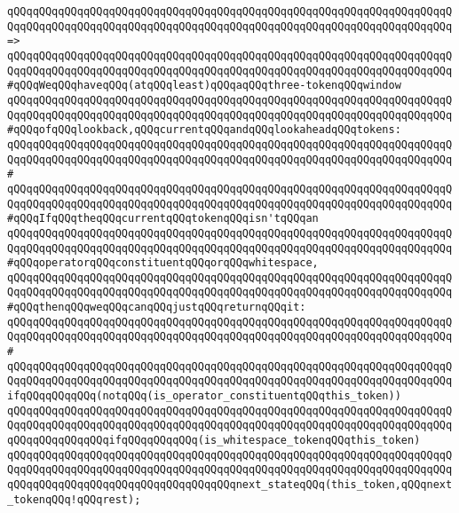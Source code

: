 \verb|qQQqqQQqqQQqqQQqqQQqqQQqqQQqqQQqqQQqqQQqqQQqqQQqqQQqqQQqqQQqqQQqqQQqqQQqqQQqqQQqqQQqqQQqqQQqqQQqqQQqqQQqqQQqqQQqqQQqqQQqqQQqqQQqqQQqqQQqqQQq=>|\newline
\verb|qQQqqQQqqQQqqQQqqQQqqQQqqQQqqQQqqQQqqQQqqQQqqQQqqQQqqQQqqQQqqQQqqQQqqQQqqQQqqQQqqQQqqQQqqQQqqQQqqQQqqQQqqQQqqQQqqQQqqQQqqQQqqQQqqQQqqQQqqQQq#qQQqWeqQQqhaveqQQq(atqQQqleast)qQQqaqQQqthree-tokenqQQqwindow|\newline
\verb|qQQqqQQqqQQqqQQqqQQqqQQqqQQqqQQqqQQqqQQqqQQqqQQqqQQqqQQqqQQqqQQqqQQqqQQqqQQqqQQqqQQqqQQqqQQqqQQqqQQqqQQqqQQqqQQqqQQqqQQqqQQqqQQqqQQqqQQqqQQq#qQQqofqQQqlookback,qQQqcurrentqQQqandqQQqlookaheadqQQqtokens:|\newline
\verb|qQQqqQQqqQQqqQQqqQQqqQQqqQQqqQQqqQQqqQQqqQQqqQQqqQQqqQQqqQQqqQQqqQQqqQQqqQQqqQQqqQQqqQQqqQQqqQQqqQQqqQQqqQQqqQQqqQQqqQQqqQQqqQQqqQQqqQQqqQQq#|\newline
\verb|qQQqqQQqqQQqqQQqqQQqqQQqqQQqqQQqqQQqqQQqqQQqqQQqqQQqqQQqqQQqqQQqqQQqqQQqqQQqqQQqqQQqqQQqqQQqqQQqqQQqqQQqqQQqqQQqqQQqqQQqqQQqqQQqqQQqqQQqqQQq#qQQqIfqQQqtheqQQqcurrentqQQqtokenqQQqisn'tqQQqan|\newline
\verb|qQQqqQQqqQQqqQQqqQQqqQQqqQQqqQQqqQQqqQQqqQQqqQQqqQQqqQQqqQQqqQQqqQQqqQQqqQQqqQQqqQQqqQQqqQQqqQQqqQQqqQQqqQQqqQQqqQQqqQQqqQQqqQQqqQQqqQQqqQQq#qQQqoperatorqQQqconstituentqQQqorqQQqwhitespace,|\newline
\verb|qQQqqQQqqQQqqQQqqQQqqQQqqQQqqQQqqQQqqQQqqQQqqQQqqQQqqQQqqQQqqQQqqQQqqQQqqQQqqQQqqQQqqQQqqQQqqQQqqQQqqQQqqQQqqQQqqQQqqQQqqQQqqQQqqQQqqQQqqQQq#qQQqthenqQQqweqQQqcanqQQqjustqQQqreturnqQQqit:|\newline
\verb|qQQqqQQqqQQqqQQqqQQqqQQqqQQqqQQqqQQqqQQqqQQqqQQqqQQqqQQqqQQqqQQqqQQqqQQqqQQqqQQqqQQqqQQqqQQqqQQqqQQqqQQqqQQqqQQqqQQqqQQqqQQqqQQqqQQqqQQqqQQq#|\newline
\verb|qQQqqQQqqQQqqQQqqQQqqQQqqQQqqQQqqQQqqQQqqQQqqQQqqQQqqQQqqQQqqQQqqQQqqQQqqQQqqQQqqQQqqQQqqQQqqQQqqQQqqQQqqQQqqQQqqQQqqQQqqQQqqQQqqQQqqQQqqQQqifqQQqqQQqqQQq(notqQQq(is_operator_constituentqQQqthis_token))|\newline
\newline
\verb|qQQqqQQqqQQqqQQqqQQqqQQqqQQqqQQqqQQqqQQqqQQqqQQqqQQqqQQqqQQqqQQqqQQqqQQqqQQqqQQqqQQqqQQqqQQqqQQqqQQqqQQqqQQqqQQqqQQqqQQqqQQqqQQqqQQqqQQqqQQqqQQqqQQqqQQqqQQqifqQQqqQQqqQQq(is_whitespace_tokenqQQqthis_token)|\newline
\verb|qQQqqQQqqQQqqQQqqQQqqQQqqQQqqQQqqQQqqQQqqQQqqQQqqQQqqQQqqQQqqQQqqQQqqQQqqQQqqQQqqQQqqQQqqQQqqQQqqQQqqQQqqQQqqQQqqQQqqQQqqQQqqQQqqQQqqQQqqQQqqQQqqQQqqQQqqQQqqQQqqQQqqQQqqQQqqQQqnext_stateqQQq(this_token,qQQqnext_tokenqQQq!qQQqrest);|\newline
